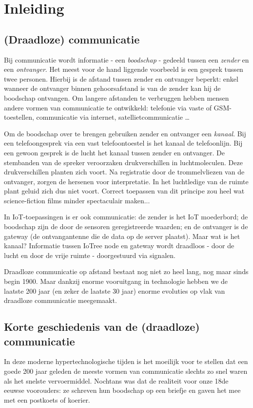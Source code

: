  \section{Inleiding}

 \subsection{(Draadloze) communicatie}

 Bij communicatie wordt informatie - een \emph{boodschap} - gedeeld tussen een \emph{zender} en een \emph{ontvanger}. Het meest voor de hand liggende voorbeeld is een gesprek tussen twee personen. Hierbij is de afstand tussen zender en ontvanger beperkt: enkel wanneer de ontvanger binnen gehoorsafstand is van de zender kan hij de boodschap ontvangen. Om langere afstanden te verbruggen hebben mensen andere vormen van communicatie te ontwikkeld: telefonie via vaste of GSM-toestellen, communicatie via internet, satellietcommunicatie \ldots

 Om de boodschap over te brengen gebruiken zender en ontvanger een \emph{kanaal}. Bij een telefoongesprek via een vast telefoontoestel is het kanaal de telefoonlijn. 
 Bij een gewoon gesprek is de lucht het kanaal tussen zender en ontvanger. De stembanden van de spreker veroorzaken drukverschillen in luchtmoleculen. Deze drukverschillen planten zich voort. Na registratie door de trommelvliezen van de ontvanger, zorgen de hersenen voor interpretatie. In het luchtledige van de ruimte plant geluid zich dus niet voort. Correct toepassen van dit principe zou heel wat science-fiction films minder spectaculair maken...

 In IoT-toepassingen is er ook communicatie: de zender is het IoT moederbord; de boodschap zijn de door de sensoren geregistreerde waarden; en de ontvanger is de gateway (de ontvangantenne die de data op de server plaatst). Maar wat is het kanaal? Informatie tussen IoTree node en gateway wordt draadloos - door de lucht en door de vrije ruimte - doorgestuurd via signalen.

 Draadloze communicatie op afstand bestaat nog niet zo heel lang, nog maar sinds begin 1900. Maar dankzij enorme vooruitgang in technologie hebben we de laatste 200 jaar (en zeker de laatste 30 jaar) enorme evoluties op vlak van  draadloze communicatie meegemaakt.

 \subsection{Korte geschiedenis van de (draadloze) communicatie}
 In deze moderne hypertechnologische tijden is het moeilijk voor te stellen dat een goede 200 jaar geleden de meeste vormen van communicatie slechts zo snel waren als het snelste vervoermiddel. Nochtans was dat de realiteit voor onze 18de eeuwse voorouders: ze schreven hun boodschap op een briefje en gaven het mee met een postkoets of koerier.
 
